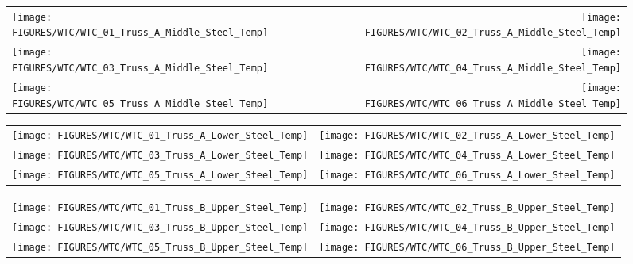 \begin{figure}[p]
\begin{tabular*}{\textwidth}{l@{\extracolsep{\fill}}r}
\texttt{[image: FIGURES/WTC/WTC\_01\_Truss\_A\_Middle\_Steel\_Temp]} &
\texttt{[image: FIGURES/WTC/WTC\_02\_Truss\_A\_Middle\_Steel\_Temp]} \\
\texttt{[image: FIGURES/WTC/WTC\_03\_Truss\_A\_Middle\_Steel\_Temp]} &
\texttt{[image: FIGURES/WTC/WTC\_04\_Truss\_A\_Middle\_Steel\_Temp]} \\
\texttt{[image: FIGURES/WTC/WTC\_05\_Truss\_A\_Middle\_Steel\_Temp]} &
\texttt{[image: FIGURES/WTC/WTC\_06\_Truss\_A\_Middle\_Steel\_Temp]}
\end{tabular*}
\label{NIST_WTC_Truss_A_Middle_Steel_Temp}
\end{figure}

\begin{figure}[p]
\begin{tabular*}{\textwidth}{l@{\extracolsep{\fill}}r}
\texttt{[image: FIGURES/WTC/WTC\_01\_Truss\_A\_Lower\_Steel\_Temp]} &
\texttt{[image: FIGURES/WTC/WTC\_02\_Truss\_A\_Lower\_Steel\_Temp]} \\
\texttt{[image: FIGURES/WTC/WTC\_03\_Truss\_A\_Lower\_Steel\_Temp]} &
\texttt{[image: FIGURES/WTC/WTC\_04\_Truss\_A\_Lower\_Steel\_Temp]} \\
\texttt{[image: FIGURES/WTC/WTC\_05\_Truss\_A\_Lower\_Steel\_Temp]} &
\texttt{[image: FIGURES/WTC/WTC\_06\_Truss\_A\_Lower\_Steel\_Temp]}
\end{tabular*}
\label{NIST_WTC_Truss_A_Lower_Steel_Temp}
\end{figure}

\begin{figure}[p]
\begin{tabular*}{\textwidth}{l@{\extracolsep{\fill}}r}
\texttt{[image: FIGURES/WTC/WTC\_01\_Truss\_B\_Upper\_Steel\_Temp]} &
\texttt{[image: FIGURES/WTC/WTC\_02\_Truss\_B\_Upper\_Steel\_Temp]} \\
\texttt{[image: FIGURES/WTC/WTC\_03\_Truss\_B\_Upper\_Steel\_Temp]} &
\texttt{[image: FIGURES/WTC/WTC\_04\_Truss\_B\_Upper\_Steel\_Temp]} \\
\texttt{[image: FIGURES/WTC/WTC\_05\_Truss\_B\_Upper\_Steel\_Temp]} &
\texttt{[image: FIGURES/WTC/WTC\_06\_Truss\_B\_Upper\_Steel\_Temp]}
\end{tabular*}
\label{NIST_WTC_Truss_B_Upper_Steel_Temp}
\end{figure}

